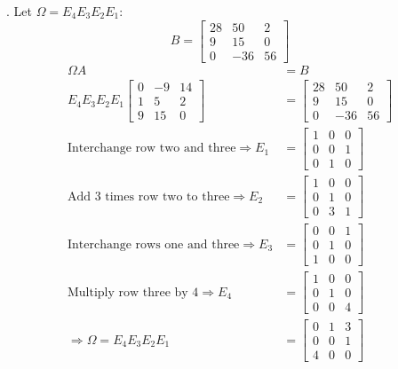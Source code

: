 \documentclass[11pt]{homework}
\begin{document}
. Let $\Omega = E_4 E_3 E_2 E_1$:  
\begin{equation*}
B = 
  \begin{bmatrix}
  28 & 50 & 2 \\
  9  & 15 & 0 \\
  0  &-36 & 56
  \end{bmatrix}
\end{equation*}
\begin{align*}
\Omega A &= B \\
E_4 E_3 E_2 E_1
  \begin{bmatrix}
  0 & -9 & 14 \\
  1 & 5 & 2 \\
  9 & 15 & 0 
  \end{bmatrix}
  &=
  \begin{bmatrix}
  28 & 50 & 2 \\
  9  & 15 & 0 \\
  0  &-36 & 56
  \end{bmatrix} \\
\text{Interchange row two and three}
\Rightarrow 
E_1 &= 
  \begin{bmatrix}
  1 & 0 & 0  \\
  0 & 0 & 1  \\
  0 & 1 & 0
  \end{bmatrix} \\
\text{Add 3 times row two to three}
\Rightarrow 
E_2 &= 
  \begin{bmatrix}
  1 & 0 & 0  \\
  0 & 1 & 0  \\
  0 & 3 & 1
  \end{bmatrix} \\
\text{Interchange rows one and three}
\Rightarrow 
E_3 &= 
  \begin{bmatrix}
  0 & 0 & 1  \\
  0 & 1 & 0  \\
  1 & 0 & 0
  \end{bmatrix} \\
\text{Multiply row three by 4}
\Rightarrow 
E_4 &= 
  \begin{bmatrix}
  1 & 0 & 0  \\
  0 & 1 & 0  \\
  0 & 0 & 4
  \end{bmatrix} \\
\Rightarrow 
\Omega = E_4 E_3 E_2 E_1 &=
  \begin{bmatrix}
  0 & 1 & 3  \\
  0 & 0 & 1  \\
  4 & 0 & 0
  \end{bmatrix} 
\end{align*}
\end{document}
